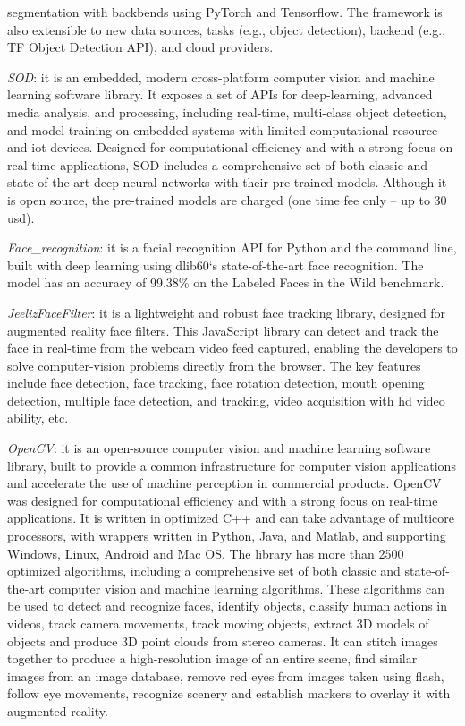 \begin{enum-c}
segmentation with backbends using PyTorch and Tensorflow.
The framework is also extensible to new data sources, tasks (e.g., object
detection), backend (e.g., TF Object Detection API), and cloud providers.
\item \emph{SOD}:
it is an embedded, modern cross-platform computer vision and machine learning
software library.
It exposes a set of APIs for deep-learning, advanced media analysis, and
processing, including real-time, multi-class object detection, and model
training on embedded systems with limited computational resource and \gls{iot}
devices.
Designed for computational efficiency and with a strong focus on real-time
applications, SOD includes a comprehensive set of both classic and
state-of-the-art deep-neural networks with their pre-trained models.
Although it is open source, the pre-trained models are charged (one time fee
only -- up to 30 \gls{usd}).
\item \emph{Face\_recognition}:
  it is a facial recognition API for Python and the command line, built with
  deep learning using dlib60‘s state-of-the-art face recognition.
  The model has an accuracy of 99.38\% on the Labeled Faces in the Wild
  benchmark.
\item \emph{JeelizFaceFilter}:
it is a lightweight and robust face tracking library, designed for augmented reality face filters.
This JavaScript library can detect and track the face in real-time from the
webcam video feed captured, enabling the developers to solve computer-vision
problems directly from the browser.
The key features include face detection, face tracking, face rotation
detection, mouth opening detection, multiple face detection, and tracking, video
acquisition with \gls{hd} video ability, etc.
\item \emph{OpenCV}:
it is an open-source computer vision and machine learning software library,
built to provide a common infrastructure for computer vision applications and
accelerate the use of machine perception in commercial products.
OpenCV was designed for computational efficiency and with a strong focus on
real-time applications. It is written in optimized C++ and can take advantage of
multicore processors, with wrappers written in Python, Java, and Matlab, and
supporting Windows, Linux, Android and Mac OS.
The library has more than 2500 optimized algorithms, including a comprehensive
set of both classic and state-of-the-art computer vision and machine learning algorithms.
These algorithms can be used to detect and recognize faces, identify objects,
classify human actions in videos, track camera movements, track moving objects,
extract 3D models of objects and produce 3D point clouds from stereo cameras.
It can stitch images together to produce a high-resolution image of an entire
scene, find similar images from an image database, remove red eyes from images
taken using flash, follow eye movements, recognize scenery and establish markers to overlay it with augmented reality.
\end{enum-c}
%
%
